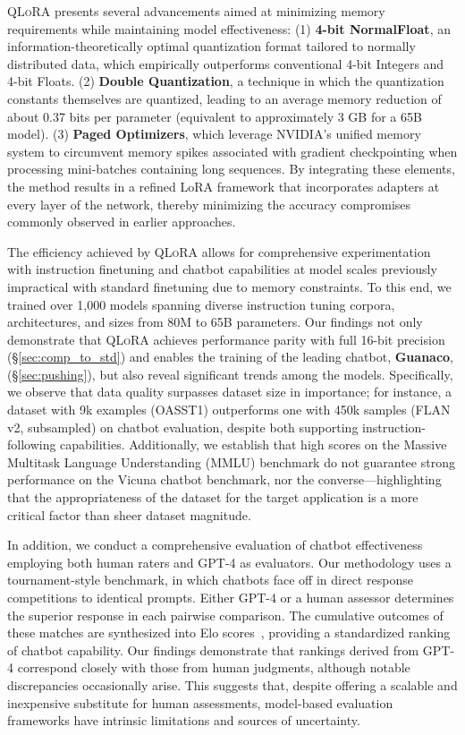 \textsc{QLoRA} presents several advancements aimed at minimizing memory requirements while maintaining model effectiveness: (1) \textbf{4-bit NormalFloat}, an information-theoretically optimal quantization format tailored to normally distributed data, which empirically outperforms conventional 4-bit Integers and 4-bit Floats. (2) \textbf{Double Quantization}, a technique in which the quantization constants themselves are quantized, leading to an average memory reduction of about 0.37 bits per parameter (equivalent to approximately 3 GB for a 65B model). (3) \textbf{Paged Optimizers}, which leverage NVIDIA's unified memory system to circumvent memory spikes associated with gradient checkpointing when processing mini-batches containing long sequences. By integrating these elements, the method results in a refined LoRA framework that incorporates adapters at every layer of the network, thereby minimizing the accuracy compromises commonly observed in earlier approaches.

The efficiency achieved by \textsc{QLoRA} allows for comprehensive experimentation with instruction finetuning and chatbot capabilities at model scales previously impractical with standard finetuning due to memory constraints. To this end, we trained over 1,000 models spanning diverse instruction tuning corpora, architectures, and sizes from 80M to 65B parameters. Our findings not only demonstrate that \textsc{QLoRA} achieves performance parity with full 16-bit precision (\S\ref{sec:comp_to_std}) and enables the training of the leading chatbot, \textbf{Guanaco}, (\S\ref{sec:pushing}), but also reveal significant trends among the models. Specifically, we observe that data quality surpasses dataset size in importance; for instance, a dataset with 9k examples (OASST1) outperforms one with 450k samples (FLAN v2, subsampled) on chatbot evaluation, despite both supporting instruction-following capabilities. Additionally, we establish that high scores on the Massive Multitask Language Understanding (MMLU) benchmark do not guarantee strong performance on the Vicuna chatbot benchmark, nor the converse—highlighting that the appropriateness of the dataset for the target application is a more critical factor than sheer dataset magnitude.

In addition, we conduct a comprehensive evaluation of chatbot effectiveness employing both human raters and GPT-4 as evaluators. Our methodology uses a tournament-style benchmark, in which chatbots face off in direct response competitions to identical prompts. Either GPT-4 or a human assessor determines the superior response in each pairwise comparison. The cumulative outcomes of these matches are synthesized into Elo scores~\citep{elo1967proposed, elo1978rating}, providing a standardized ranking of chatbot capability. Our findings demonstrate that rankings derived from GPT-4 correspond closely with those from human judgments, although notable discrepancies occasionally arise. This suggests that, despite offering a scalable and inexpensive substitute for human assessments, model-based evaluation frameworks have intrinsic limitations and sources of uncertainty.

